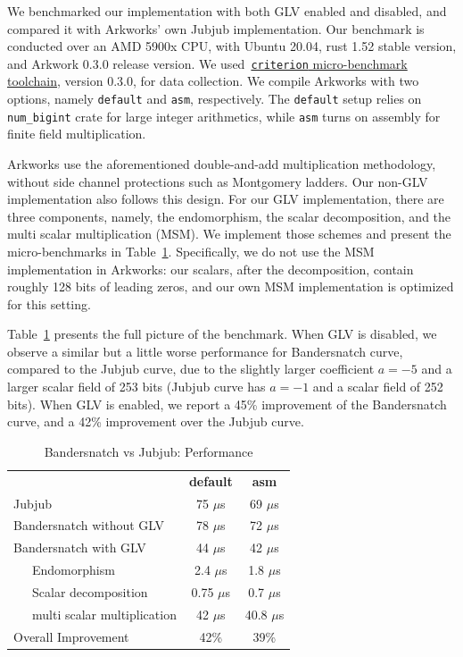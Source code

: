 \documentclass[smallextended]{svjour3}
\begin{document}
We benchmarked our implementation with both GLV enabled and disabled, and 
compared it with Arkworks' own Jubjub implementation. 
Our benchmark is conducted over an AMD 5900x CPU, with Ubuntu 20.04,
rust 1.52 stable version, and Arkwork 0.3.0 release version.
We used~\href{https://docs.rs/criterion}{\texttt{criterion}
  micro-benchmark toolchain},  version 0.3.0, for data collection. We
compile Arkworks with two options, namely \texttt{default} and
\texttt{asm}, respectively.
The \texttt{default} setup relies on \texttt{num\_bigint} crate for
large integer arithmetics, while \texttt{asm} turns on assembly for
finite field multiplication. 

Arkworks use the aforementioned double-and-add
multiplication methodology, without side channel protections such 
as Montgomery ladders. Our non-GLV implementation also follows
this design. For our GLV implementation, there are three components,
namely, the endomorphism, the scalar decomposition, and the
multi scalar multiplication (MSM). We implement those schemes and 
present the micro-benchmarks in Table~\ref{tab:comp_full}.
Specifically, we do not use the MSM implementation in Arkworks:
our scalars, after the decomposition, contain roughly 128 bits
of leading zeros, and our own MSM implementation is 
optimized for this setting.

Table~\ref{tab:comp_full} presents the full picture of the benchmark.
When GLV is disabled, we observe a similar but a little worse 
performance for Bandersnatch curve, compared to
the Jubjub curve, due to the slightly larger coefficient 
$a=-5$ and a larger scalar field of 253 bits (Jubjub curve has $a=-1$
and a scalar field of 252 bits).
When GLV is enabled, we report a 45\% improvement of the Bandersnatch
curve, and a 42\% improvement over the Jubjub curve.



\begin{table}[!ht]
  \centering%
  \begin{tabularx}{\textwidth}{lcc}
      & \textbf{default} & \textbf{asm}\\
    Jubjub & 75 $\mu$s & 69 $\mu$s \\
    Bandersnatch without GLV & 78 $\mu$s & 72 $\mu$s  \\   
    Bandersnatch with GLV& 44 $\mu$s & 42 $\mu$s \\
    \ \ \ Endomorphism & 2.4 $\mu$s& 1.8 $\mu$s\\
    \ \ \ Scalar decomposition & 0.75 $\mu$s & 0.7 $\mu$s \\
    \ \ \ multi scalar multiplication & 42 $\mu$s &  40.8 $\mu$s\\
    Overall Improvement & 42\% & 39\% \\
  \end{tabularx}
  \caption{Bandersnatch vs Jubjub: Performance}
  \label{tab:comp_full}
\end{table}
\end{document}
